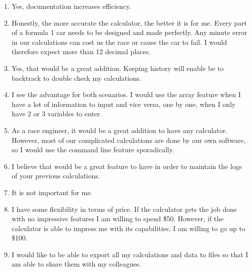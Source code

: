 \documentclass[titlepage]{article}
\begin{document}
\begin{itemize}
\begin{enumerate}
                        \item Yes, documentation increases efficiency.
                        \item Honestly, the more accurate the calculator, the better it is for me. Every part of a formula 1 car needs to be designed and made perfectly. Any minute error in our calculations can cost us the race or cause the car to fail. I would therefore expect more than 12 decimal places.
                        \item Yes, that would be a great addition. Keeping history will enable be to backtrack to double check my calculations.
                        \item I see the advantage for both scenarios. I would use the array feature when I have a lot of information to input and vice versa, one by one, when I only have 2 or 3 variables to enter.
                        \item As a race engineer, it would be a great addition to have any calculator. However, most of our complicated calculations are done by our own software, so I would use the command line feature sporadically.
                        \item I believe that would be a great feature to have in order to maintain the logs of your previous calculations.
                        \item It is not important for me.
                        \item I have some flexibility in terms of price. If the calculator gets the job done with no impressive features I am willing to spend \$50. However, if the calculator is able to impress me with its capabilities, I am willing to go up to \$100.
                        \item I would like to be able to export all my calculations and data to files so that I am able to share them with my colleagues. 
                    \end{enumerate}
            \end{itemize}
            
\end{document}
